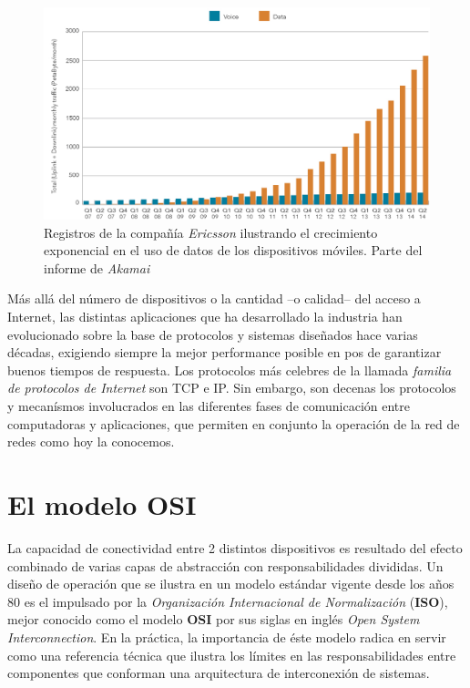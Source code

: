 \begin{figure}[!h]
	\centering
	\includegraphics[scale=0.5]{imagenes/conexiones_moviles}
	\caption{Registros de la compañía \emph{Ericsson} ilustrando el crecimiento exponencial en el uso de datos de los dispositivos móviles. Parte del informe de \emph{Akamai} \cite{report:akamai}}
	\label{fig:akamai_stats}
\end{figure}

Más allá del número de dispositivos o la cantidad --o calidad-- del acceso a Internet, las distintas aplicaciones que ha desarrollado la industria han evolucionado sobre la base de protocolos y sistemas diseñados hace varias décadas, exigiendo siempre la mejor performance posible en pos de garantizar buenos tiempos de respuesta. Los protocolos más celebres de la llamada \emph{familia de protocolos de Internet} son TCP e IP. Sin embargo, son decenas los protocolos y mecanísmos involucrados en las diferentes fases de comunicación entre computadoras y aplicaciones, que permiten en conjunto la operación de la red de redes como hoy la conocemos.

\section{El modelo OSI}
La capacidad de conectividad entre 2 distintos dispositivos es resultado del efecto combinado de varias capas de abstracción con responsabilidades divididas. Un diseño de operación que se ilustra en un modelo estándar vigente desde los años 80 es el impulsado por la \emph{Organización Internacional de Normalización} (\textbf{ISO}), mejor conocido como el modelo \textbf{OSI} por sus siglas en inglés \emph{Open System Interconnection}. En la práctica, la importancia de éste modelo radica en servir como una referencia técnica que ilustra los límites en las responsabilidades entre componentes que conforman una arquitectura de interconexión de sistemas.

